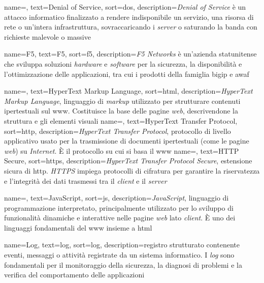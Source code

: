  {
    name=,
    text=Denial of Service,
    sort=dos,
    description={\emph{Denial of Service} è un attacco informatico finalizzato a rendere indisponibile un servizio, una risorsa di rete o un'intera infrastruttura, sovraccaricando i \emph{server} o saturando la banda con richieste malevole o massive}
}


 {
    name=F5,
    text=F5,
    sort=f5,
    description={\emph{F5 Networks} è un'azienda statunitense che sviluppa soluzioni \emph{hardware} e \emph{software} per la sicurezza, la disponibilità e l'ottimizzazione delle applicazioni, tra cui i prodotti della famiglia \gls{bigip} e \gls{awaf}}
}


 {
    name=,
    text=HyperText Markup Language,
    sort=html,
    description={\emph{HyperText Markup Language}, linguaggio di \emph{markup} utilizzato per strutturare contenuti ipertestuali sul \gls{www}. Costituisce la base delle pagine \emph{web}, descrivendone la struttura e gli elementi visuali}
}
 {
    name=,
    text=HyperText Transfer Protocol,
    sort=http,
    description={\emph{HyperText Transfer Protocol}, protocollo di livello applicativo usato per la trasmissione di documenti ipertestuali (come le pagine \emph{web}) su \emph{Internet}. È il protocollo su cui si basa il \gls{www}} 
}
 {
    name=,
    text=HTTP Secure,
    sort=https,
    description={\emph{HyperText Transfer Protocol Secure}, estensione sicura di \gls{http}. \emph{HTTPS} impiega protocolli di cifratura per garantire la riservatezza e l'integrità dei dati trasmessi tra il \emph{client} e il \emph{server}}
}


 {
    name=,
    text=JavaScript,
    sort=js,
    description={\emph{JavaScript}, linguaggio di programmazione interpretato, principalmente utilizzato per lo sviluppo di funzionalità dinamiche e interattive nelle pagine \emph{web} lato \emph{client}. È uno dei linguaggi fondamentali del \gls{www} insieme a \gls{html}}
}


 {
    name=Log,
    text=log,
    sort=log,
    description={registro strutturato contenente eventi, messaggi o attività registrate da un sistema informatico. I \emph{log} sono fondamentali per il monitoraggio della sicurezza, la diagnosi di problemi e la verifica del comportamento delle applicazioni}
}

